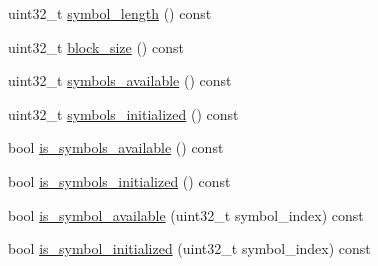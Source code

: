 \begin{DoxyCompactItemize}
uint32\-\_\-t \hyperlink{classkodo_1_1proxy__layer_a87583efe23d937a2cb3426bde4566ebc}{symbol\-\_\-length} () const 
\begin{DoxyCompactList}\small\item\em \end{DoxyCompactList}\item 
uint32\-\_\-t \hyperlink{classkodo_1_1proxy__layer_a11f6ce3e7ef3deb2a051e25208123d20}{block\-\_\-size} () const 
\begin{DoxyCompactList}\small\item\em \end{DoxyCompactList}\item 
uint32\-\_\-t \hyperlink{classkodo_1_1proxy__layer_ad766fc9c5c73713f93179da6984d2665}{symbols\-\_\-available} () const 
\begin{DoxyCompactList}\small\item\em \end{DoxyCompactList}\item 
uint32\-\_\-t \hyperlink{classkodo_1_1proxy__layer_a80ab466a1710f95d156374b6c29e5a95}{symbols\-\_\-initialized} () const 
\begin{DoxyCompactList}\small\item\em \end{DoxyCompactList}\item 
bool \hyperlink{classkodo_1_1proxy__layer_a0e69f24aecca96018ea70d729db062ec}{is\-\_\-symbols\-\_\-available} () const 
\begin{DoxyCompactList}\small\item\em \end{DoxyCompactList}\item 
bool \hyperlink{classkodo_1_1proxy__layer_a2cb9fee14aab5f922f68acd8a8de35d0}{is\-\_\-symbols\-\_\-initialized} () const 
\begin{DoxyCompactList}\small\item\em \end{DoxyCompactList}\item 
bool \hyperlink{classkodo_1_1proxy__layer_afecc5c180c7b43e2f52472941915ca51}{is\-\_\-symbol\-\_\-available} (uint32\-\_\-t symbol\-\_\-index) const 
\begin{DoxyCompactList}\small\item\em \end{DoxyCompactList}\item 
bool \hyperlink{classkodo_1_1proxy__layer_ac43da3b0571ff3acbb9fa8b663ad74d3}{is\-\_\-symbol\-\_\-initialized} (uint32\-\_\-t symbol\-\_\-index) const 
\begin{DoxyCompactList}\small\item\em \end{DoxyCompactList}\item 

\end{DoxyCompactItemize}
